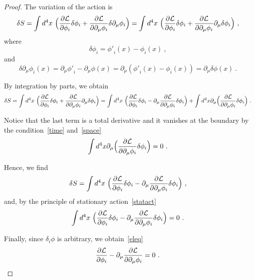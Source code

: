     \begin{proof}
        The variation of the action is 
        \begin{equation*}
            \delta S = \int d^4 x ~ \Big ( \frac{\partial\mathcal L}{\partial\phi_i} \delta \phi_i + \frac{\partial\mathcal L}{\partial\partial_\mu \phi_i} \delta \partial_\mu \phi_i \Big) = \int d^4 x ~ \Big ( \frac{\partial\mathcal L}{\partial\phi_i} \delta \phi_i + \frac{\partial\mathcal L}{\partial\partial_\mu \phi_i} \partial_\mu \delta \phi_i \Big) ~,
        \end{equation*}
        where
        \begin{equation*}
            \delta \phi_i = {\phi'}_i(x) - \phi_i(x) ~,
        \end{equation*} 
        and 
        \begin{equation*}
            \delta \partial_\mu \phi_i(x) = \partial_\mu {\phi'}_i - \partial_\mu \phi(x) = \partial_\mu ({\phi'}_i(x) - \phi_i(x)) = \partial_\mu \delta \phi(x) ~.
        \end{equation*}

        By integration by parts, we obtain
        \begin{equation*}
            \delta S = \int d^4 x ~ \Big ( \frac{\partial\mathcal L}{\partial\phi_i} \delta \phi_i + \frac{\partial\mathcal L}{\partial\partial_\mu \phi_i} \partial_\mu \delta \phi_i \Big) = \int d^4 x ~ \Big( \frac{\partial\mathcal L}{\partial\phi_i} \delta \phi_i - \partial_\mu \frac{\partial\mathcal L}{\partial\partial_\mu \phi_i} \delta \phi_i \Big) + \int d^4x \partial_\mu \Big( \frac{\partial\mathcal L }{\partial\partial_\mu \phi_i} \delta \phi_i \Big) ~.
        \end{equation*}

        Notice that the last term is a total derivative and it vanishes at the boundary by the condition~\eqref{time} and~\eqref{space}
        \begin{equation*}
            \int d^4x \partial_\mu \Big( \frac{\partial\mathcal L }{\partial\partial_\mu \phi_i} \delta \phi_i \Big) = 0 ~.
        \end{equation*}

        Hence, we find 
        \begin{equation*}
            \delta S = \int d^4 x ~ \Big( \frac{\partial\mathcal L}{\partial\phi_i} \delta \phi_i - \partial_\mu \frac{\partial\mathcal L}{\partial\partial_\mu \phi_i} \delta \phi_i \Big) ~,
        \end{equation*}
        and, by the principle of stationary action~\eqref{statact} 
        \begin{equation*}
            \int d^4 x ~ \Big( \frac{\partial\mathcal L}{\partial\phi_i} \delta \phi_i - \partial_\mu \frac{\partial\mathcal L}{\partial\partial_\mu \phi_i} \delta \phi_i \Big) = 0 ~.
        \end{equation*}

        Finally, since $\delta_i \phi$ is arbitrary, we obtain~\eqref{eleq}
        \begin{equation*}
            \frac{\partial\mathcal L}{\partial\phi_i} - \partial_\mu \frac{\partial\mathcal L}{\partial\partial_\mu \phi_i} = 0 ~.
        \end{equation*}
    \end{proof}

